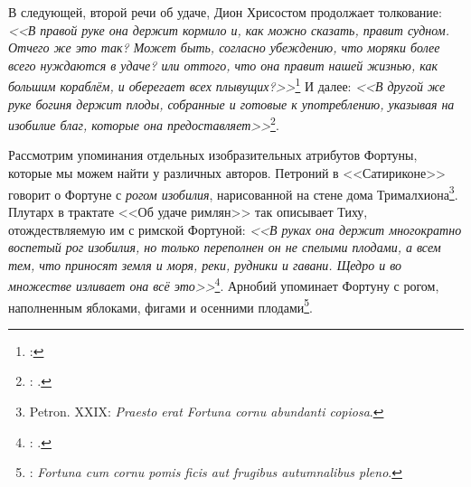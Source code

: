 
В следующей, второй речи об удаче, Дион Хрисостом продолжает толкование: \textit{<<В правой руке она держит кормило и, как можно сказать, правит судном. Отчего же это так? Может быть, согласно убеждению, что моряки более всего нуждаются в удаче? или оттого, что она правит нашей жизнью, как большим кораблём, и оберегает всех плывущих?>>}\footnote{: } И далее: \textit{<<В другой же руке богиня держит плоды, собранные и готовые к употреблению, указывая на изобилие благ, которые она предоставляет>>}\footnote{: .}.





Рассмотрим упоминания отдельных изобразительных атрибутов Фортуны, которые мы можем найти у различных авторов. Петроний в <<Сатириконе>> говорит о Фортуне с \textit{рогом изобилия}, нарисованной на стене дома Трималхиона\footnote{Petron. XXIX: \textit{Praesto erat Fortuna cornu abundanti copiosa}.}. Плутарх в трактате <<Об удаче римлян>> так описывает Тиху, отождествляемую им с римской Фортуной: \textit{<<В руках она держит многократно воспетый рог изобилия, но только переполнен он не спелыми плодами, а всем тем, что приносят земля и моря, реки, рудники и гавани. Щедро и во множестве изливает она всё это>>}\footnote{: .}. Арнобий упоминает Фортуну с рогом, наполненным яблоками, фигами и осенними плодами\footnote{: \textit{Fortuna cum cornu pomis ficis aut frugibus autumnalibus pleno}.}.

